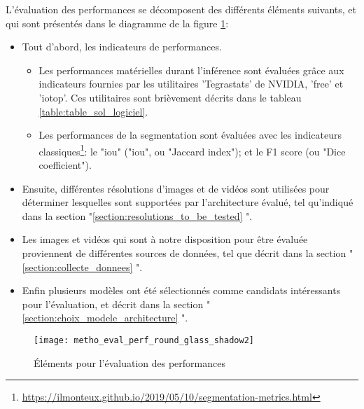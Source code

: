 ﻿L’évaluation des performances se décomposent des différents éléments suivants, et qui sont présentés dans le diagramme de la figure \ref{fig:metho_eval}: 
\begin{itemize}
    \item Tout d'abord, les indicateurs de performances.
    \begin{itemize}
        \item Les performances matérielles durant l'inférence sont évaluées grâce aux indicateurs fournies par les utilitaires 'Tegrastats' de NVIDIA, 'free' et 'iotop'. Ces utilitaires sont brièvement décrits dans le tableau \ref{table:table_sol_logiciel}.
        \item Les performances de la segmentation sont évaluées avec les indicateurs classiques\footnote{\url{https://ilmonteux.github.io/2019/05/10/segmentation-metrics.html}}: le "\acrshort{iou}" ("\acrlong{iou}", ou "Jaccard index"); et le F1 score (ou "Dice coefficient").
    \end{itemize}
    \item Ensuite, différentes résolutions d'images et de vidéos sont utilisées pour déterminer lesquelles sont supportées par l'architecture évalué, tel qu'indiqué dans la section "\ref{section:resolutions_to_be_tested} ". 
    \item Les images et vidéos qui sont à notre disposition pour être évaluée proviennent de différentes sources de données, tel que décrit dans la section "\ref{section:collecte_donnees} ". 
    \item Enfin plusieurs modèles ont été sélectionnés comme candidats intéressants pour l'évaluation, et décrit dans la section "\ref{section:choix_modele_architecture} ".
\end{itemize} 
\label{metho_eval}
\begin{figure}[H]
    \centering
    \texttt{[image: metho\_eval\_perf\_round\_glass\_shadow2]}
    \caption{Éléments pour l'évaluation des performances}
    \label{fig:metho_eval}
\end{figure}
